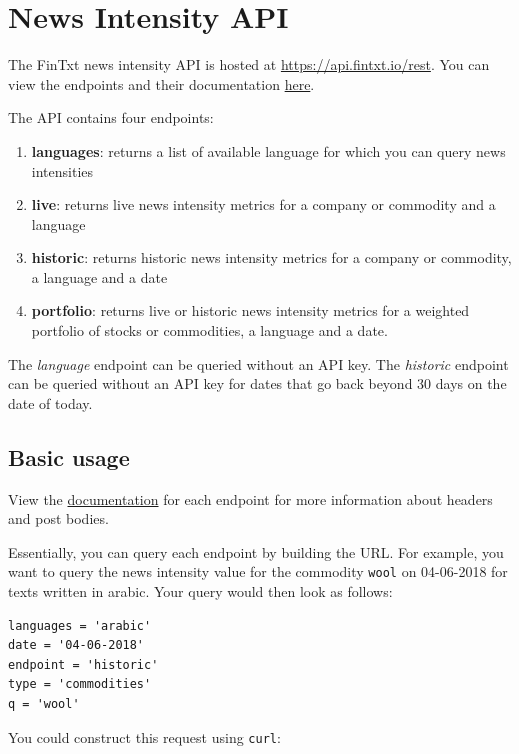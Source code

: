 \documentclass[]{book}
\providecommand{\tightlist}{%
  \setlength{\itemsep}{0pt}\setlength{\parskip}{0pt}}
\theoremstyle{definition}
\theoremstyle{definition}
\theoremstyle{definition}
\theoremstyle{remark}
\begin{document}
\chapter{News Intensity API}\label{theapi}

The FinTxt news intensity API is hosted at
\url{https://api.fintxt.io/rest}. You can view the endpoints and their
documentation \href{https://api.fintxt.io/rest/__swagger__/}{here}.

The API contains four endpoints:

\begin{enumerate}
\def\labelenumi{\arabic{enumi}.}
\tightlist
\item
  \textbf{languages}: returns a list of available language for which you
  can query news intensities
\item
  \textbf{live}: returns live news intensity metrics for a company or
  commodity and a language
\item
  \textbf{historic}: returns historic news intensity metrics for a
  company or commodity, a language and a date
\item
  \textbf{portfolio}: returns live or historic news intensity metrics
  for a weighted portfolio of stocks or commodities, a language and a
  date.
\end{enumerate}

The \emph{language} endpoint can be queried without an API key. The
\emph{historic} endpoint can be queried without an API key for dates
that go back beyond 30 days on the date of today.

\section{Basic usage}\label{basic-usage}

View the \href{https://api.fintxt.io/rest/__swagger__/}{documentation}
for each endpoint for more information about headers and post bodies.

Essentially, you can query each endpoint by building the URL. For
example, you want to query the news intensity value for the commodity
\texttt{wool} on 04-06-2018 for texts written in arabic. Your query
would then look as follows:

\begin{verbatim}
languages = 'arabic'
date = '04-06-2018'
endpoint = 'historic'
type = 'commodities'
q = 'wool'
\end{verbatim}

You could construct this request using \texttt{curl}:
\end{document}

